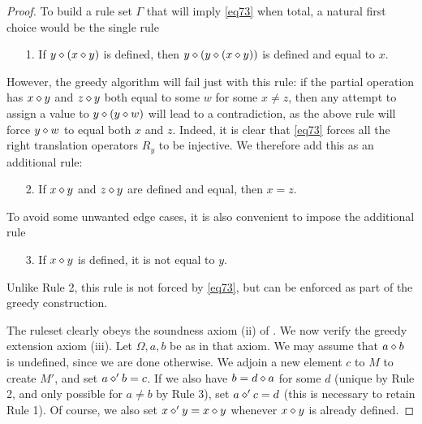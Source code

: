 \begin{proof} To build a rule set $\Gamma$ that will imply \eqref{eq73} when total, a natural first choice would be the single rule
\begin{itemize}
\item[1.] If $y \diamond (x \diamond y)$ is defined, then $y \diamond (y \diamond (x \diamond y))$ is defined and equal to $x$.
\end{itemize}
However, the greedy algorithm will fail just with this rule: if the partial operation has $x \diamond y$ and $z \diamond y$ both equal to some $w$ for some $x \neq z$, then any attempt to assign a value to $y \diamond (y \diamond w)$ will lead to a contradiction, as the above rule will force $y \diamond w$ to equal both $x$ and $z$.  Indeed, it is clear that \eqref{eq73} forces all the right translation operators $R_y$ to be injective.  We therefore add this as an additional rule:
\begin{itemize}
\item[2.] If $x \diamond y$ and $z \diamond y$ are defined and equal, then $x=z$.
\end{itemize}
To avoid some unwanted edge cases, it is also convenient to impose the additional rule
\begin{itemize}
  \item[3.] If $x \diamond y$ is defined, it is not equal to $y$.
\end{itemize}
Unlike Rule 2, this rule is not forced by \eqref{eq73}, but can be enforced as part of the greedy construction.

The ruleset clearly obeys the soundness axiom (ii) of .  We now verify the greedy extension axiom (iii).  Let $\Omega,a,b$ be as in that axiom. We may assume that $a \diamond b$ is undefined, since we are done otherwise. We adjoin a new element $c$ to $M$ to create $M'$, and set $a \diamond' b = c$.  If we also have $b = d \diamond a$ for some $d$ (unique by Rule 2, and only possible for $a \neq b$ by Rule 3), set $a \diamond' c = d$ (this is necessary to retain Rule 1).  Of course, we also set $x \diamond' y = x \diamond y$ whenever $x \diamond y$ is already defined.


\end{proof}
